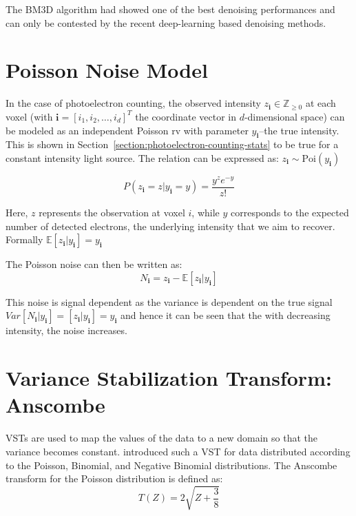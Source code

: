 The \gls{BM3D} algorithm had showed one of the best denoising performances and can only be contested by the recent deep-learning based denoising methods. 

\section{Poisson Noise Model}\label{sec:poisson-noise-model}
In the case of photoelectron counting, the observed intensity $z_{\mathbf{i}} \in \mathbb{Z}_{\geq 0}$ at each voxel (with $\mathbf{i} = [i_1, i_2, \dots, i_d]^T$ the coordinate vector in $d$-dimensional space) can be modeled as an independent Poisson \gls{rv} with parameter $y_{\mathbf{i}}$--the true intensity. This is shown in Section~\ref{section:photoelectron-counting-stats} to be true for a constant intensity light source. The relation can be expressed as: $z_{\mathbf{i}} \sim \text{Poi}(y_{\mathbf{i}})$

\begin{equation}
    P(z_{\mathbf{i}} = z| y_{\mathbf{i}} = y) = \frac{y^z e^{-y}}{z!}
\end{equation}


Here, $z$ represents the observation at voxel $i$, while $y$ corresponds to the expected number of detected electrons, the underlying intensity that we aim to recover. Formally $\mathbb{E}[z_{\mathbf{i}} | y_{\mathbf{i}}] = y_{\mathbf{i}}$

The Poisson noise can then be written as:
\begin{equation}
    N_{\mathbf{i}} = z_{\mathbf{i}} - \mathbb{E}[z_{\mathbf{i}} | y_{\mathbf{i}}]
\end{equation}

This noise is signal dependent as the variance is dependent on the true signal $Var[N_{\mathbf{i}} | y_{\mathbf{i}}] = [z_{\mathbf{i}} | y_{\mathbf{i}}] = y_{\mathbf{i}}$ and hence it can be seen that the with decreasing intensity, the noise increases.

\section{Variance Stabilization Transform: Anscombe}

\Glspl{VST} are used to map the values of the data to a new domain so that the variance becomes constant. \citeauthor{anscombeTransformationPoissonBinomial1948} \cite{anscombeTransformationPoissonBinomial1948} introduced such a \gls{VST} for data distributed according to the Poisson, Binomial, and Negative Binomial distributions. The Anscombe transform for the Poisson distribution is defined as:
\begin{equation}
    T(Z) = 2 \sqrt{Z + \frac{3}{8}}
\end{equation}

